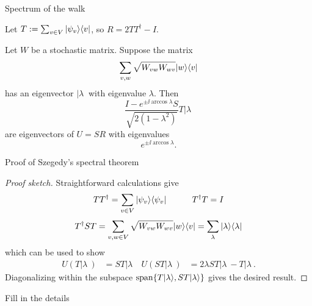 
\begin{frame}{Spectrum of the walk}
  
Let $T := \sum_{v \in V} |\psi_v\rangle\langle v|$, so $R=2TT^\dag - I$.

\pause
\bigskip
  
\begin{theorem}[Szegedy]
  Let $W$ be a stochastic matrix.
  Suppose the matrix
  \[
  \sum_{v,w} \sqrt{W_{vw}W_{wv}}|w\rangle\langle v|
  \]
  has an eigenvector $|\lambda\>$ with eigenvalue $\lambda$.
  Then
  \[
    \frac{I - e^{\pm\ii\arccos\lambda}S}{\sqrt{2(1-\lambda^2)}} T|\lambda\>
  \]
  are eigenvectors of $U=SR$ with eigenvalues
  \[
    e^{\pm\ii\arccos\lambda}.
  \]
\end{theorem}

\end{frame}


\begin{frame}{Proof of Szegedy's spectral theorem}

\begin{proof}[Proof sketch]
  Straightforward calculations give
  \[
    TT^\dag = \sum_{v \in V} |\psi_v\rangle\langle\psi_v| \qquad\quad
    T^\dag T = I \]\[
    T^\dag S T = \sum_{v,w \in V} \sqrt{W_{vw}W_{wv}}|w\rangle\langle v|
               = \sum_\lambda |\lambda\rangle\langle\lambda|
  \]
  \pause
  which can be used to show
  \begin{align*}
    U(T|\lambda\>) &= ST|\lambda\> &
    U(ST|\lambda\>) &= 2\lambda ST|\lambda\> - T|\lambda\>.
  \end{align*}
  \pause
  Diagonalizing within the subspace $\mathop{\mathrm{span}}\{T|\lambda\rangle,ST|\lambda\rangle\}$ gives the desired result.
\end{proof}

\pause
\bigskip

 Fill in the details

\end{frame}


